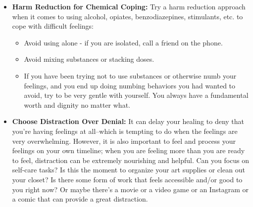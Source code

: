 \documentclass[12pt,letterpaper]{book}
\begin{document}
\begin{itemize}
    \item \textbf{Harm Reduction for Chemical Coping:} Try a harm reduction approach when it comes to using alcohol, opiates, benzodiazepines, stimulants, etc. to cope with difficult feelings:
    \begin{itemize}
        \item Avoid using alone - if you are isolated, call a friend on the phone.
        \item Avoid mixing substances or stacking doses.
        \item If you have been trying not to use substances or otherwise numb your feelings, and you end up doing numbing behaviors you had wanted to avoid, try to be very gentle with yourself. You always have a fundamental worth and dignity no matter what.
    \end{itemize}
    \item \textbf{Choose Distraction Over Denial:} It can delay your healing to deny that you're having feelings at all–which is tempting to do when the feelings are very overwhelming. However, it is also important to feel and process your feelings on your own timeline; when you are feeling more than you are ready to feel, distraction can be extremely nourishing and helpful. Can you focus on self-care tasks? Is this the moment to organize your art supplies or clean out your closet? Is there some form of work that feels accessible and/or good to you right now? Or maybe there's a movie or a video game or an Instagram or a comic that can provide a great distraction.
\end{itemize}
\end{document}
